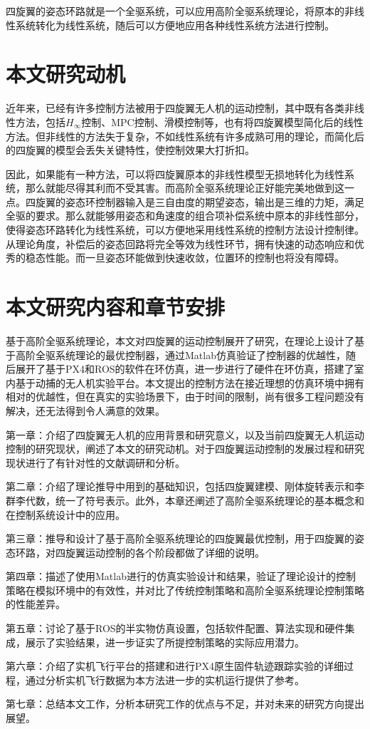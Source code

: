 四旋翼的姿态环路就是一个全驱系统，可以应用高阶全驱系统理论，将原本的非线性系统转化为线性系统，随后可以方便地应用各种线性系统方法进行控制。
\section{本文研究动机}
近年来，已经有许多控制方法被用于四旋翼无人机的运动控制，其中既有各类非线性方法，包括$H_\infty$控制\cite{H}、MPC控制\cite{MPC}、滑模控制\cite{sliding}等，也有将四旋翼模型简化后的线性方法\cite{boua2007}。但非线性的方法失于复杂，不如线性系统有许多成熟可用的理论，而简化后的四旋翼的模型会丢失关键特性，使控制效果大打折扣。

因此，如果能有一种方法，可以将四旋翼原本的非线性模型无损地转化为线性系统，那么就能尽得其利而不受其害。而高阶全驱系统理论正好能完美地做到这一点。四旋翼的姿态环控制器输入是三自由度的期望姿态，输出是三维的力矩，满足全驱的要求。那么就能够用姿态和角速度的组合项补偿系统中原本的非线性部分，使得姿态环路转化为线性系统，可以方便地采用线性系统的控制方法设计控制律。从理论角度，补偿后的姿态回路将完全等效为线性环节，拥有快速的动态响应和优秀的稳态性能。而一旦姿态环能做到快速收敛，位置环的控制也将没有障碍。
\section{本文研究内容和章节安排}
基于高阶全驱系统理论，本文对四旋翼的运动控制展开了研究，在理论上设计了基于高阶全驱系统理论的最优控制器，通过Matlab仿真验证了控制器的优越性，随后展开了基于PX4和ROS的软件在环仿真，进一步进行了硬件在环仿真，搭建了室内基于动捕的无人机实验平台。本文提出的控制方法在接近理想的仿真环境中拥有相对的优越性，但在真实的实验场景下，由于时间的限制，尚有很多工程问题没有解决，还无法得到令人满意的效果。

第一章：介绍了四旋翼无人机的应用背景和研究意义，以及当前四旋翼无人机运动控制的研究现状，阐述了本文的研究动机。对于四旋翼运动控制的发展过程和研究现状进行了有针对性的文献调研和分析。

第二章：介绍了理论推导中用到的基础知识，包括四旋翼建模、刚体旋转表示和李群李代数，统一了符号表示。此外，本章还阐述了高阶全驱系统理论的基本概念和在控制系统设计中的应用。


第三章：推导和设计了基于高阶全驱系统理论的四旋翼最优控制，用于四旋翼的姿态环路，对四旋翼运动控制的各个阶段都做了详细的说明。

第四章：描述了使用Matlab进行的仿真实验设计和结果，验证了理论设计的控制策略在模拟环境中的有效性，并对比了传统控制策略和高阶全驱系统理论控制策略的性能差异。

第五章：讨论了基于ROS的半实物仿真设置，包括软件配置、算法实现和硬件集成，展示了实验结果，进一步证实了所提控制策略的实际应用潜力。

第六章：介绍了实机飞行平台的搭建和进行PX4原生固件轨迹跟踪实验的详细过程，通过分析实机飞行数据为本方法进一步的实机运行提供了参考。

第七章：总结本文工作，分析本研究工作的优点与不足，并对未来的研究方向提出展望。
